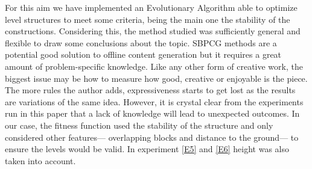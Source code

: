 \documentclass[sigconf]{acmart}
\begin{document}
For this aim we have implemented an Evolutionary Algorithm able to optimize 
level structures to meet some criteria, being the main one the stability of the 
constructions.
Considering this, the method studied was
sufficiently general and flexible to draw some conclusions about the
topic. SBPCG methods are a potential good solution to offline content
generation but it requires a great amount of problem-specific
knowledge. Like any other form of creative work, the biggest issue may
be how to measure how good, creative or enjoyable is the piece. The
more rules the author adds, expressiveness starts to get lost as the
results are variations of the same idea. However, it is crystal clear
from the experiments run in this paper that a lack of knowledge
will lead to unexpected outcomes.
In our case, the fitness function used the 
stability of the structure and only considered other features--- overlapping 
blocks and distance to the ground--- to ensure the levels would be valid.
In experiment \ref{E5} and \ref{E6} height was also taken into account.


\end{document}

